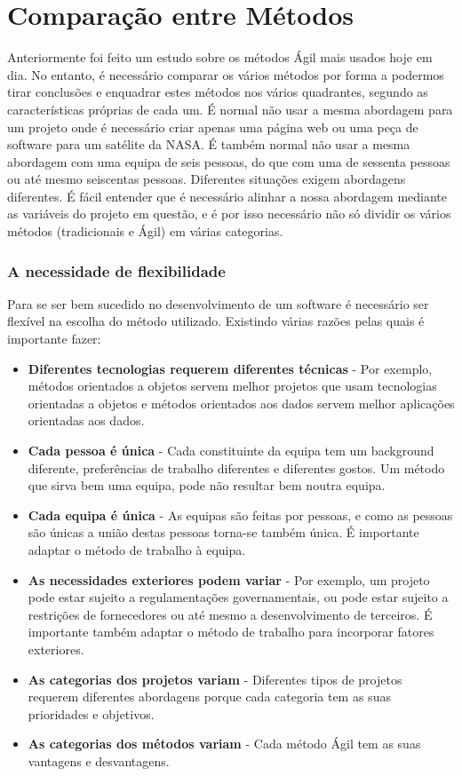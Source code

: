 \chapter{Comparação entre Métodos}
\label{cht:grupos}

Anteriormente foi feito um estudo sobre os métodos Ágil mais usados hoje em dia. No entanto, é necessário comparar os vários métodos por forma a podermos tirar conclusões e enquadrar estes métodos nos vários quadrantes, segundo as características próprias de cada um.
É normal não usar a mesma abordagem para um projeto onde é necessário criar apenas uma página web ou uma peça de software para um satélite da NASA. É também normal não usar a mesma abordagem com uma equipa de seis pessoas, do que com uma de sessenta pessoas ou até mesmo seiscentas pessoas. Diferentes situações exigem abordagens diferentes.
É fácil entender que é necessário alinhar a nossa abordagem mediante as variáveis do projeto em questão, e é por isso necessário não só dividir os vários métodos (tradicionais e Ágil) em várias categorias. 

\subsection{A necessidade de flexibilidade}

Para se ser bem sucedido no desenvolvimento de um software é necessário ser flexível na escolha do método utilizado. Existindo várias razões pelas quais é importante fazer:

\begin{itemize}
    \item \textbf{Diferentes tecnologias requerem diferentes técnicas} - Por exemplo, métodos orientados a objetos servem melhor projetos que usam tecnologias orientadas a objetos e métodos orientados aos dados servem melhor aplicações orientadas aos dados.
    \item \textbf{Cada pessoa é única} - Cada constituinte da equipa tem um background diferente, preferências de trabalho diferentes e diferentes gostos. Um método que sirva bem uma equipa, pode não resultar bem noutra equipa.
    \item \textbf{Cada equipa é única} - As equipas são feitas por pessoas, e como as pessoas são únicas a união destas pessoas torna-se também única. É importante adaptar o método de trabalho à equipa.
    \item \textbf{As necessidades exteriores podem variar} - Por exemplo, um projeto pode estar sujeito a regulamentações governamentais, ou pode estar sujeito a restrições de fornecedores ou até mesmo a desenvolvimento de terceiros. É importante também adaptar o método de trabalho para incorporar fatores exteriores.
    \item \textbf{As categorias dos projetos variam} - Diferentes tipos de projetos requerem diferentes abordagens porque cada categoria tem as suas prioridades e objetivos.
    \item \textbf{As categorias dos métodos variam} - Cada método Ágil tem as suas vantagens e desvantagens.
\end{itemize}

